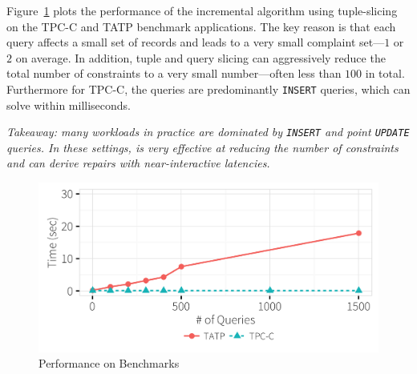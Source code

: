 Figure~\ref{f:tpcctatp} plots the performance of the incremental algorithm using tuple-slicing on the TPC-C and TATP benchmark applications.  
The key reason is that each query affects a small set of records and leads to a very small complaint set---$1$ or $2$ on average.
In addition, tuple and query slicing can aggressively reduce the total number of constraints to a very small number---often less than $100$ in total.
Furthermore for TPC-C, the queries are predominantly \texttt{INSERT} queries, which \sys can solve within milliseconds.

{\it Takeaway: many workloads in practice are dominated by \texttt{INSERT} and point \texttt{UPDATE} queries.  
  In these settings, \sys is very effective at reducing the number of constraints and can derive repairs with near-interactive latencies.}
\begin{figure}[h]
\centering
  \includegraphics[width = .75\columnwidth]{figures/benchmark_time}
  \vspace*{-.2in}
  \caption{Performance on Benchmarks}
  \label{f:tpcctatp} 
  \vspace*{-.1in}
\end{figure}

